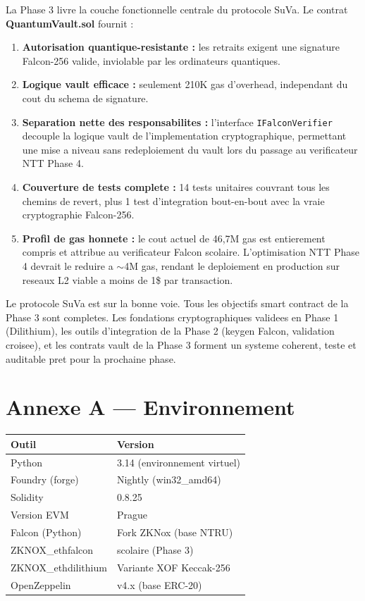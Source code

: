 \documentclass[11pt,a4paper]{article}
\begin{document}
La Phase 3 livre la couche fonctionnelle centrale du protocole SuVa. Le contrat
\textbf{QuantumVault.sol} fournit :

\begin{enumerate}
  \item \textbf{Autorisation quantique-resistante :} les retraits exigent une signature Falcon-256
        valide, inviolable par les ordinateurs quantiques.
  \item \textbf{Logique vault efficace :} seulement 210K gas d'overhead, independant du cout
        du schema de signature.
  \item \textbf{Separation nette des responsabilites :} l'interface \texttt{IFalconVerifier}
        decouple la logique vault de l'implementation cryptographique, permettant une
        mise a niveau sans redeploiement du vault lors du passage au verificateur NTT Phase 4.
  \item \textbf{Couverture de tests complete :} 14 tests unitaires couvrant tous les chemins
        de revert, plus 1 test d'integration bout-en-bout avec la vraie cryptographie Falcon-256.
  \item \textbf{Profil de gas honnete :} le cout actuel de 46,7M gas est entierement compris
        et attribue au verificateur Falcon scolaire. L'optimisation NTT Phase 4 devrait
        le reduire a $\sim$4M gas, rendant le deploiement en production sur reseaux L2
        viable a moins de 1\$ par transaction.
\end{enumerate}

Le protocole SuVa est sur la bonne voie. Tous les objectifs smart contract de la Phase 3 sont
completes. Les fondations cryptographiques validees en Phase 1 (Dilithium), les outils
d'integration de la Phase 2 (keygen Falcon, validation croisee), et les contrats vault de la
Phase 3 forment un systeme coherent, teste et auditable pret pour la prochaine phase.

\appendix
\section{Annexe A --- Environnement}

\begin{center}
\begin{tabular}{ll}
\toprule
\textbf{Outil} & \textbf{Version} \\
\midrule
Python & 3.14 (environnement virtuel) \\
Foundry (forge) & Nightly (win32\_amd64) \\
Solidity & 0.8.25 \\
Version EVM & Prague \\
Falcon (Python) & Fork ZKNox (base NTRU) \\
ZKNOX\_ethfalcon & scolaire (Phase 3) \\
ZKNOX\_ethdilithium & Variante XOF Keccak-256 \\
OpenZeppelin & v4.x (base ERC-20) \\
\bottomrule
\end{tabular}
\end{center}
\end{document}
